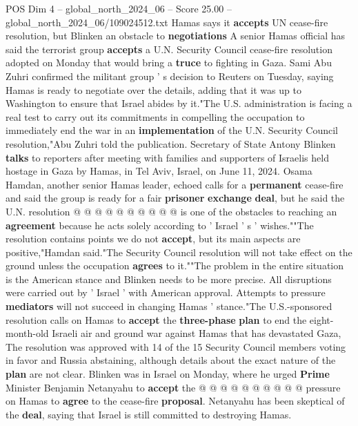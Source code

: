 \begin{textsample}{POS Dim 4 – global\_north\_2024\_06 – Score 25.00 – global\_north\_2024\_06/109024512.txt}  \label{ex:f4_pos_133}
Hamas says it \textbf{accepts} UN cease-fire resolution, but Blinken an obstacle to \textbf{negotiations} A senior Hamas official has said the terrorist group \textbf{accepts} a U.N.
Security Council cease-fire resolution adopted on Monday that would bring a \textbf{truce} to fighting in Gaza.
Sami Abu Zuhri confirmed the militant group ' s decision to Reuters on Tuesday, saying Hamas is ready to negotiate over the details, adding that it was up to Washington to ensure that Israel abides by it."The U.S. administration is facing a real test to carry out its commitments in compelling the occupation to immediately end the war in an \textbf{implementation} of the U.N.
Security Council resolution,"Abu Zuhri told the publication.
Secretary of State Antony Blinken \textbf{talks} to reporters after meeting with families and supporters of Israelis held hostage in Gaza by Hamas, in Tel Aviv, Israel, on June 11, 2024.
Osama Hamdan, another senior Hamas leader, echoed calls for a \textbf{permanent} cease-fire and said the group is ready for a fair \textbf{prisoner} \textbf{exchange} \textbf{deal}, but he said the U.N. resolution @ @ @ @ @ @ @ @ @ @ is one of the obstacles to reaching an \textbf{agreement} because he acts solely according to ' Israel ' s ' wishes.""The resolution contains points we do not \textbf{accept}, but its main aspects are positive,"Hamdan said."The Security Council resolution will not take effect on the ground unless the occupation \textbf{agrees} to it.""The problem in the entire situation is the American stance and Blinken needs to be more precise.
All disruptions were carried out by ' Israel ' with American approval.
Attempts to pressure \textbf{mediators} will not succeed in changing Hamas ' stance."The U.S.-sponsored resolution calls on Hamas to \textbf{accept} the \textbf{three-phase} \textbf{plan} to end the eight-month-old Israeli air and ground war against Hamas that has devastated Gaza, The resolution was approved with 14 of the 15 Security Council members voting in favor and Russia abstaining, although details about the exact nature of the \textbf{plan} are not clear.
Blinken was in Israel on Monday, where he urged \textbf{Prime} Minister Benjamin Netanyahu to \textbf{accept} the @ @ @ @ @ @ @ @ @ @ pressure on Hamas to \textbf{agree} to the cease-fire \textbf{proposal}.
Netanyahu has been skeptical of the \textbf{deal}, saying that Israel is still committed to destroying Hamas.

\end{textsample}
